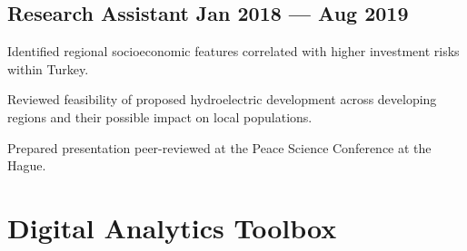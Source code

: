 \documentclass[doublesided, paper=a4, fontsize=10.5pt]{my-resume}
\begin{document}
{    \subsection{{Research Assistant \hfill Jan 2018 --- Aug 2019}}
    \begin{zitemize}
        \small
        \item{Identified regional socioeconomic features correlated with higher investment risks within Turkey.}
        \item{Reviewed feasibility of proposed hydroelectric development across developing regions and their possible impact on local populations.}
        \item{Prepared presentation peer-reviewed at the Peace Science Conference at the Hague.}
    \end{zitemize}



    \section{Digital Analytics Toolbox}

}
\end{document}
